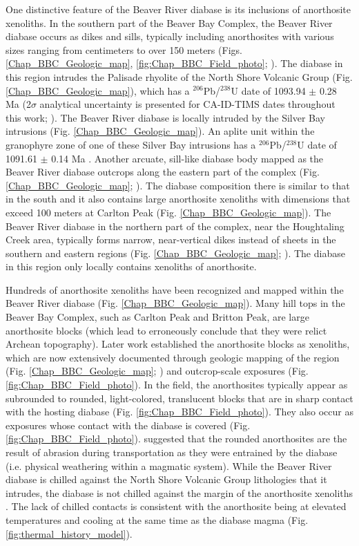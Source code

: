 One distinctive feature of the Beaver River diabase is its inclusions of anorthosite xenoliths. In the southern part of the Beaver Bay Complex, the Beaver River diabase occurs as dikes and sills, typically including anorthosites with various sizes ranging from centimeters to over 150 meters (Figs. \ref{Chap_BBC_Geologic_map}, \ref{fig:Chap_BBC_Field_photo}; \citealp{Grout1939a, Morrison1983a}). The diabase in this region intrudes the Palisade rhyolite of the North Shore Volcanic Group (Fig. \ref{Chap_BBC_Geologic_map}), which has a $^{206}$Pb/$^{238}$U date of 1093.94 $\pm$ 0.28 Ma (2$\sigma$ analytical uncertainty is presented for CA-ID-TIMS dates throughout this work; \cite{Swanson-Hysell2019a}). The Beaver River diabase is locally intruded by the Silver Bay intrusions (Fig. \ref{Chap_BBC_Geologic_map}). An aplite unit within the granophyre zone of one of these Silver Bay intrusions has a $^{206}$Pb/$^{238}$U date of 1091.61 $\pm$ 0.14 Ma \citep{Swanson-Hysell2019a}. Another arcuate, sill-like diabase body mapped as the Beaver River diabase outcrops along the eastern part of the complex (Fig. \ref{Chap_BBC_Geologic_map}; \citealp{Miller1997a}). The diabase composition there is similar to that in the south and it also contains large anorthosite xenoliths with dimensions that exceed 100 meters at Carlton Peak (Fig. \ref{Chap_BBC_Geologic_map}). The Beaver River diabase in the northern part of the complex, near the Houghtaling Creek area, typically forms narrow, near-vertical dikes instead of sheets in the southern and eastern regions (Fig. \ref{Chap_BBC_Geologic_map}; \citealp{Miller1994a}). The diabase in this region only locally contains xenoliths of anorthosite. 

Hundreds of anorthosite xenoliths have been recognized and mapped within the Beaver River diabase (Fig. \ref{Chap_BBC_Geologic_map}). Many hill tops in the Beaver Bay Complex, such as Carlton Peak and Britton Peak, are large anorthosite blocks (which lead \cite{Lawson1893a} to erroneously conclude that they were relict Archean topography). Later work established the anorthosite blocks as xenoliths, which are now extensively documented through geologic mapping of the region (Fig. \ref{Chap_BBC_Geologic_map}; \citealp{Miller2001a, Miller1988a, Miller1989a, Boerboom2004a, Boerboom2006a, Boerboom2006b, Boerboom2007a}) and outcrop-scale exposures (Fig. \ref{fig:Chap_BBC_Field_photo}). In the field, the anorthosites typically appear as subrounded to rounded, light-colored, translucent blocks that are in sharp contact with the hosting diabase (Fig. \ref{fig:Chap_BBC_Field_photo}). They also occur as exposures whose contact with the diabase is covered (Fig. \ref{fig:Chap_BBC_Field_photo}). \cite{Grout1939a} suggested that the rounded anorthosites are the result of abrasion during transportation as they were entrained by the diabase (i.e. physical weathering within a magmatic system). While the Beaver River diabase is chilled against the North Shore Volcanic Group lithologies that it intrudes, the diabase is not chilled against the margin of the anorthosite xenoliths \citep{Morrison1983a, Miller1997a}. The lack of chilled contacts is consistent with the anorthosite being at elevated temperatures and cooling at the same time as the diabase magma (Fig. \ref{fig:thermal_history_model}).

